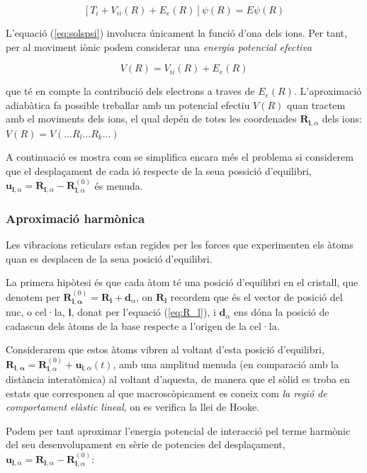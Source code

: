\documentclass[12pt]{article} %
\let\vec\mathbf %
\begin{document}
\begin{equation}
 \label{eq:solspsi}
 \left[T_i+V_{ii}(R)+E_e(R)\right]\psi(R)=E \psi(R)
\end{equation}

L'equació (\ref{eq:solspsi}) involucra únicament la funció d'ona dels ions. Per tant, per al moviment iònic podem considerar una \emph{energia potencial efectiva}

\begin{equation}
 V(R)=V_{ii}(R)+E_e(R)
\end{equation}

que té en compte la contribució dels electrons a traves de $E_e(R)$. L'aproximació adiabàtica fa possible treballar amb un potencial efectiu $V(R)$ quan tractem amb el moviments dels ions, el qual depén de totes les coordenades $\vec R_{\vec l, \alpha}$ dels ions: $V(R)=V(\ldots R_l\ldots R_k\ldots)$

A continuació es mostra  com se simplifica encara més el problema si considerem que el desplaçament de cada ió respecte de la seua possició d'equilibri, $\vec u_{\vec l,\alpha}=\vec R_{\vec l,\alpha}-\vec R_{\vec l,\alpha}^{(0)}$ és menuda.
  
\subsubsection{Aproximació harmònica}

Les vibracions reticulars estan regides per les forces que experimenten els àtoms quan es desplacen de la seua posició d'equilibri. 

La primera hipòtesi és que cada àtom té una posició d'equilibri en el cristall, que denotem per $\vec R^{(0)}_{\vec l,\vec\alpha}=\vec R_\vec l+\vec d_\alpha$, on $\vec R_\vec l$ recordem que és el vector de posició del nuc, o cel·la, $\vec l$, donat per l'equació (\ref{eq:R_l}), i $\vec d_\alpha$ ens dóna la posició de cadascun dels àtoms de la base respecte a l'origen de la cel·la. 

Considerarem que estos àtoms vibren al voltant d'esta posició d'equilibri, $\vec R_{\vec l,\vec\alpha}=\vec R^{(0)}_{\vec l,\alpha}+\vec u_{\vec l,\alpha}(t)$, amb una amplitud menuda (en comparació amb la distància interatòmica) al voltant d'aquesta,   de manera que el sòlid es troba en estats que corresponen al que macroscòpicament es coneix com \textit{la regió de comportament elàstic lineal}, on es verifica la llei de Hooke.

Podem per tant aproximar l'energia potencial de interacció pel terme harmònic del seu desenvolupament en sèrie de potencies del desplaçament, $\vec u_{\vec l,\alpha}=\vec R_{\vec l,\alpha}-\vec R^{(0)}_{\vec l,\alpha}$:
\end{document}
